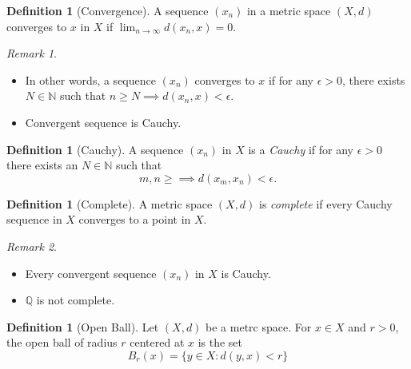 \documentclass[12pt, lettersize]{book}
\theoremstyle{plain}
\theoremstyle{definition}
\newtheorem{dfn}[thm]{Definition}
\theoremstyle{remark}
\newtheorem*{rem}{Remark}
\newcommand{\N}{\mathbb{N}}
\newcommand{\Q}{\mathbb{Q}}
\begin{document}
		\begin{dfn}[Convergence]
			A sequence $(x_n)$ in a metric space $(X,d)$ converges to $x$ in $X$ if $\lim_{n\rightarrow\infty}d(x_n,x)=0$.
		\end{dfn}
		\begin{rem}
			\begin{itemize}
				\item In other words, a sequence $(x_n)$ converges to $x$ if for any $\epsilon>0$, there exists $N\in\N$ such that $n\geq N\implies d(x_n,x)<\epsilon$.
				\item Convergent sequence is Cauchy.
			\end{itemize}
		\end{rem}
		
		\begin{dfn}[Cauchy]
			A sequence $(x_n)$ in $X$ is a \emph{Cauchy} if for any $\epsilon>0$ there exists an $N\in\N$ such that
			\begin{displaymath}
				m,n\geq\implies d(x_m,x_n)<\epsilon.
			\end{displaymath}
		\end{dfn}
		
		\begin{dfn}[Complete]
			A metric space $(X,d)$ is \emph{complete} if every Cauchy sequence in $X$ converges to a point in $X$.
		\end{dfn}
		\begin{rem}
			\begin{itemize}
				\item Every convergent sequence $(x_n)$ in $X$ is Cauchy.
				\item $\Q$ is not complete. 
			\end{itemize}
		\end{rem}
		
		\begin{dfn}[Open Ball]
			Let $(X,d)$ be a metrc space. For $x\in X$ and $r>0$, the open ball of radius $r$ centered at $x$ is the set
			\begin{displaymath}
				B_r(x)=\{y\in X: d(y,x)<r\}
			\end{displaymath}
		\end{dfn}
		
\end{document}
